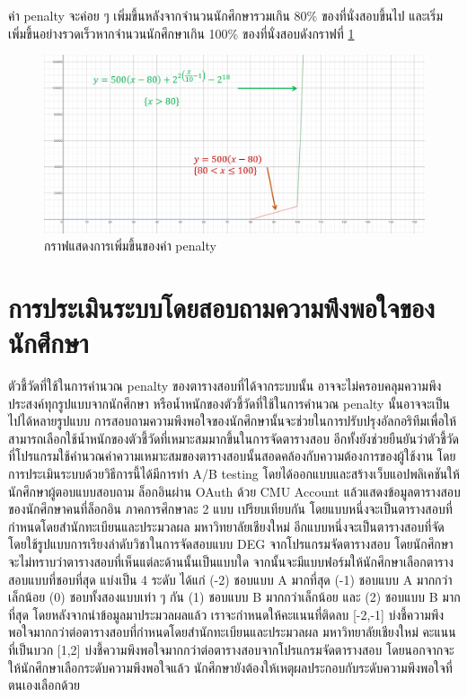 ค่า penalty จะค่อย ๆ เพิ่มขึ้นหลังจากจำนวนนักศึกษารวมเกิน 80\% ของที่นั่งสอบขึ้นไป และเริ่มเพิ่มขึ้นอย่างรวดเร็วหากจำนวนนักศึกษาเกิน 100\% ของที่นั่งสอบดังกราฟที่ \ref{fig:penalty_graph}
\begin{figure}
    \begin{center}
      \includegraphics[width=\linewidth]{images/penalty_graph.png}
    \end{center}
    \caption[กราฟแสดงการเพิ่มขึ้นของค่า penalty]{กราฟแสดงการเพิ่มขึ้นของค่า penalty}
    \label{fig:penalty_graph}     
\end{figure}


\section{การประเมินระบบโดยสอบถามความพึงพอใจของนักศึกษา}
\label{sec:ab-eval-design}
ตัวชี้วัดที่ใช้ในการคำนวณ penalty ของตารางสอบที่ได้จากระบบนั้น อาจจะไม่ครอบคลุมความพึงประสงค์ทุกรูปแบบจากนักศึกษา หรือน้ำหนักของตัวชี้วัดที่ใช้ในการคำนวณ penalty นั้นอาจจะเป็นไปได้หลายรูปแบบ
\enskip การสอบถามความพึงพอใจของนักศึกษานั้นจะช่วยในการปรับปรุงอัลกอริทึมเพื่อให้สามารถเลือกใช้น้ำหนักของตัวชี้วัดที่เหมาะสมมากขึ้นในการจัดตารางสอบ
อีกทั้งยังช่วยยืนยันว่าตัวชี้วัดที่โปรแกรมใช้คํานวณค่าความเหมาะสมของตารางสอบนั้นสอดคล้องกับความต้องการของผู้ใช้งาน 
\enskip โดยการประเมินระบบด้วยวิธีการนี้ได้มีการทำ A/B testing โดยได้ออกแบบและสร้างเว็บแอปพลิเคชันให้นักศึกษาผู้ตอบแบบสอบถาม
ล็อกอินผ่าน OAuth ด้วย CMU Account แล้วแสดงข้อมูลตารางสอบของนักศึกษาคนที่ล็อกอิน ภาคการศึกษาละ 2 แบบ เปรียบเทียบกัน 
โดยแบบหนึ่งจะเป็นตารางสอบที่กำหนดโดยสำนักทะเบียนและประมวลผล มหาวิทยาลัยเชียงใหม่ 
อีกแบบหนึ่งจะเป็นตารางสอบที่จัดโดยใช้รูปแบบการเรียงลำดับวิชาในการจัดสอบแบบ DEG จากโปรแกรมจัดตารางสอบ
โดยนักศึกษาจะไม่ทราบว่าตารางสอบที่เห็นแต่ละด้านนั้นเป็นแบบใด จากนั้นจะมีแบบฟอร์มให้นักศึกษาเลือกตารางสอบแบบที่ชอบที่สุด แบ่งเป็น 4 ระดับ ได้แก่ (-2) ชอบแบบ A มากที่สุด (-1) ชอบแบบ A มากกว่าเล็กน้อย (0) ชอบทั้งสองแบบเท่า ๆ กัน (1) ชอบแบบ B มากกว่าเล็กน้อย และ (2) ชอบแบบ B มากที่สุด 
โดยหลังจากนำข้อมูลมาประมวลผลแล้ว เราจะกำหนดให้คะแนนที่ติดลบ [-2,-1] บ่งชี้ความพึงพอใจมากกว่าต่อตารางสอบที่กำหนดโดยสำนักทะเบียนและประมวลผล มหาวิทยาลัยเชียงใหม่
คะแนนที่เป็นบวก [1,2] บ่งชี้ความพึงพอใจมากกว่าต่อตารางสอบจากโปรแกรมจัดตารางสอบ โดยนอกจากจะให้นักศึกษาเลือกระดับความพึงพอใจแล้ว นักศึกษายังต้องให้เหตุผลประกอบกับระดับความพึงพอใจที่ตนเองเลือกด้วย


